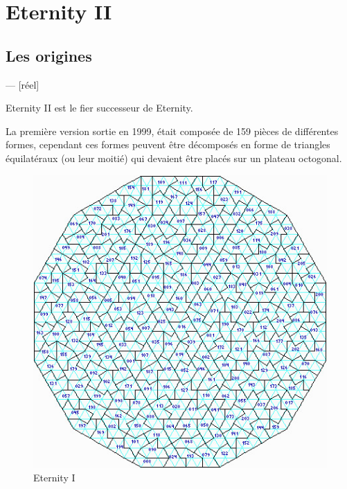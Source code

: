 \section{Eternity II}
	\subsection{Les origines}
	--- [réel]
	
	Eternity II est le fier successeur de Eternity.
	
	La première version sortie en 1999, était composée de 159 pièces de différentes formes, cependant ces formes peuvent être décomposés en forme de triangles équilatéraux (ou leur moitié) qui devaient être placés sur un plateau octogonal. 
	
	\begin{figure}[H]
		\includegraphics[width=\linewidth]{images/eternity_1.jpg}
		\caption{Eternity I}\label{fig:eternity_1}
		\endminipage\hfill

\end{figure}
